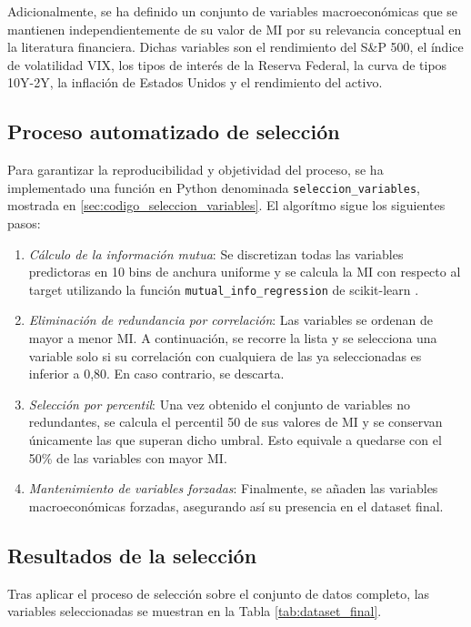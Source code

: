 Adicionalmente, se ha definido un conjunto de variables macroeconómicas que se mantienen independientemente de su valor de MI por su relevancia conceptual en la literatura financiera. Dichas variables son el rendimiento del S\&P 500, el índice de volatilidad VIX, los tipos de interés de la Reserva Federal, la curva de tipos 10Y-2Y, la inflación de Estados Unidos y el rendimiento del activo.

\subsection{Proceso automatizado de selección}
Para garantizar la reproducibilidad y objetividad del proceso, se ha implementado una función en Python denominada \texttt{seleccion\_variables}, mostrada en \ref{sec:codigo_seleccion_variables}. El algorítmo sigue los siguientes pasos:

\begin{enumerate}
    \item \emph{Cálculo de la información mutua}: Se discretizan todas las variables predictoras en 10 bins de anchura uniforme y se calcula la MI con respecto al target utilizando la función \texttt{mutual\_info\_regression} de scikit-learn \cite{scikit_learn}.
    \item \emph{Eliminación de redundancia por correlación}: Las variables se ordenan de mayor a menor MI. A continuación, se recorre la lista y se selecciona una variable solo si su correlación con cualquiera de las ya seleccionadas es inferior a 0,80. En caso contrario, se descarta.
    \item \emph{Selección por percentil}: Una vez obtenido el conjunto de variables no redundantes, se calcula el percentil 50 de sus valores de MI y se conservan únicamente las que superan dicho umbral. Esto equivale a quedarse con el 50\% de las variables con mayor MI.
    \item \emph{Mantenimiento de variables forzadas}: Finalmente, se añaden las variables macroeconómicas forzadas, asegurando así su presencia en el dataset final.
\end{enumerate}

\subsection{Resultados de la selección}
Tras aplicar el proceso de selección sobre el conjunto de datos completo, las variables seleccionadas se muestran en la Tabla \ref{tab:dataset_final}.

